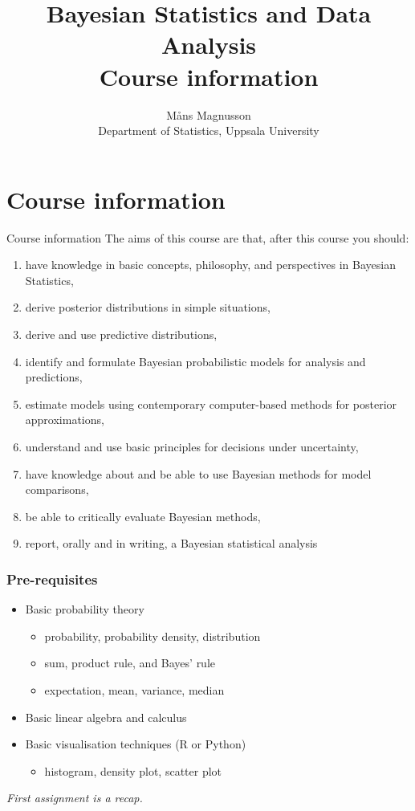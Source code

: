 \documentclass[10pt,handout]{beamer}
\title[]{{\color{black}Bayesian Statistics and Data Analysis \\ Course information}}
\author[]{M{\aa}ns Magnusson \\ Department of Statistics, Uppsala University}
\date{}
\begin{document}
\frame{\titlepage
}



\section{Course information}
\frame{\sectionpage}

\begin{frame}{Course information}
The aims of this course are that, after this course you should:\\[3mm]\pause
\begin{enumerate}
\item have knowledge in basic concepts, philosophy, and perspectives in Bayesian Statistics,
\item derive posterior distributions in simple situations,
\item derive and use predictive distributions,
\item identify and formulate Bayesian probabilistic models for analysis and predictions,
\item estimate models using contemporary computer-based methods for posterior approximations,
\item understand and use basic principles for decisions under uncertainty,
\item have knowledge about and be able to use Bayesian methods for model comparisons,
\item be able to critically evaluate Bayesian methods,
\item report, orally and in writing, a Bayesian statistical analysis
\end{enumerate}

\end{frame}


\begin{frame}
  \frametitle{Pre-requisites}
  \begin{itemize}
  \item Basic probability theory
    \begin{itemize}
    \item probability, probability density, distribution
    \item sum, product rule, and Bayes' rule
    \item expectation, mean, variance, median
  \end{itemize}
  \pause
  \item Basic linear algebra and calculus
  \pause
  \item Basic visualisation techniques (R or Python)
  \begin{itemize}
    \item histogram, density plot, scatter plot
  \end{itemize}
  \end{itemize}
  \pause
  \emph{First assignment is a recap.}

\end{frame}
\end{document}
